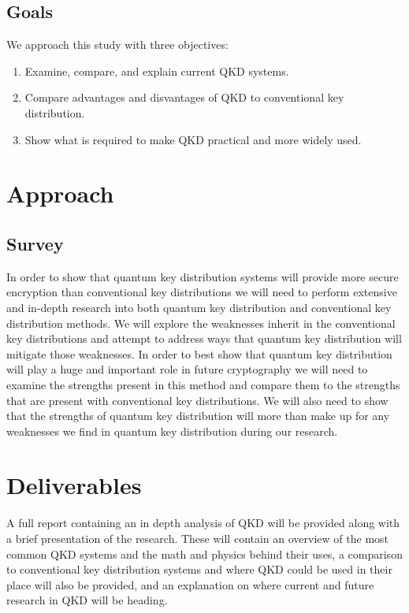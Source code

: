 \documentclass[conference]{IEEEtran}
\begin{document}
\subsection{Goals}
We approach this study with three objectives:
\begin{enumerate}
\setcounter{enumi}{0}
\item Examine, compare, and explain current QKD systems.
\item Compare advantages and disvantages of QKD to conventional key distribution.
\item Show what is required to make QKD practical and more widely used.\\
\end{enumerate}

\section{Approach}

\subsection{Survey}
In order to show that quantum key distribution systems will provide more secure encryption than conventional key distributions we will need to perform extensive and in-depth research into both quantum key distribution and conventional key distribution methods. We will explore the weaknesses inherit in the conventional key distributions and attempt to address ways that quantum key distribution will mitigate those weaknesses. In order to best show that quantum key distribution will play a huge and important role in future cryptography we will need to examine the strengths present in this method and compare them to the strengths that are present with conventional key distributions. We will also need to show that the strengths of quantum key distribution will more than make up for any weaknesses we find in quantum key distribution during our research.\\

\section{Deliverables}
A full report containing an in depth analysis of QKD will be provided along with a brief presentation of the research. These will contain an overview of the most common QKD systems and the math and physics behind their uses, a comparison to conventional key distribution systems and where QKD could be used in their place will also be provided, and an explanation on where current and future research in QKD will be heading.\\
\end{document}
